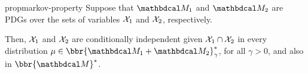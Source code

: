 \documentclass[twoside]{article}
\newcommand\discard[1]{}
\begin{document}
\begin{linked}{prop}{markov-property}
    Suppose that $\dg M_1$ and $\dg M_2$ are PDGs
    over the sets of variables $\mathcal X_1$ and $\mathcal X_2$, respectively.
%
\discard{
    Then for all $\gamma > 0$, we have that
    \[  \bbr{\dg M_1 \bundle \dg M_2}^*_\gamma
			~\models~
		\X_1 \mathbin{\bot\!\!\!\bot} \X_2 \mid \X_1 \cap \X_2. \] 
    That is: for every distribution $\mu \in \bbr{\dg M_1 \bundle \dg M_2}^*_\gamma$,
    the variables of $\dg M_1$ and of $\dg M_2$ are conditionally independent given the variables they have in common.
}
Then,
$\mathcal X_1$
and $\mathcal X_2$
are conditionally independent given $\mathcal X_1 \cap \mathcal X_2$
in every distribution $\mu \in \bbr{\dg M_1 \bundle \dg M_2}^*_\gamma$,
for all $\gamma > 0$,
and also in $\bbr{\dg M}^*$. 
\end{linked}
\end{document}
